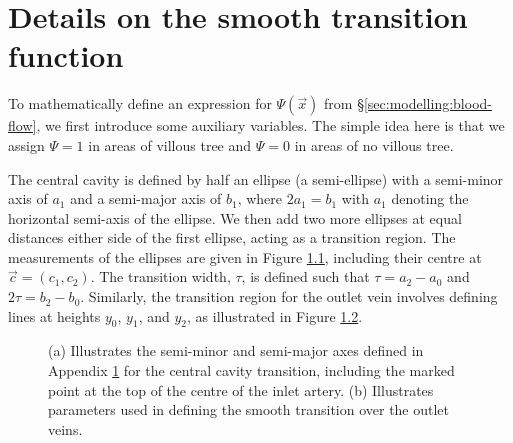 \chapter{Details on the smooth transition function} \label{sec:smooth-transition}
    To mathematically define an expression for $\Psi(\vec{x})$ from \S\ref{sec:modelling:blood-flow}, we first introduce some auxiliary variables. The simple idea here is that we assign $\Psi = 1$ in areas of villous tree and $\Psi = 0$ in areas of no villous tree.

    The central cavity is defined by half an ellipse (a semi-ellipse) with a semi-minor axis of $a_1$ and a semi-major axis of $b_1$, where $2a_1 = b_1$ with $a_1$ denoting the horizontal semi-axis of the ellipse. We then add two more ellipses at equal distances either side of the first ellipse, acting as a transition region. The measurements of the ellipses are given in Figure \ref{fig:transition-sizes:cavity}, including their centre at $\vec{c} = (c_1, c_2)$. The transition width, $\tau$, is defined such that $\tau = a_2 - a_0$ and $2\tau = b_2 - b_0$. Similarly, the transition region for the outlet vein involves defining lines at heights $y_0$, $y_1$, and $y_2$, as illustrated in Figure \ref{fig:transition-sizes:vein}.

    \begin{figure}
        \begin{subfigure}[b]{0.45\textwidth}
            \centering
            
            \caption{}
            \label{fig:transition-sizes:cavity}
        \end{subfigure}
        \hfill
        \begin{subfigure}[b]{0.45\textwidth}
            \centering
            
            \caption{}
            \label{fig:transition-sizes:vein}
        \end{subfigure}
        \caption{(a) Illustrates the semi-minor and semi-major axes defined in Appendix \ref{sec:smooth-transition} for the central cavity transition, including the marked point at the top of the centre of the inlet artery. (b) Illustrates parameters used in defining the smooth transition over the outlet veins.}
        \label{fig:transition-sizes}
    \end{figure}

